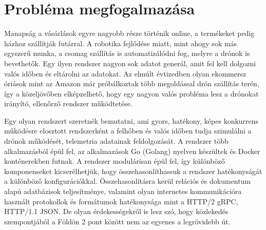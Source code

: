 
\section{Probléma megfogalmazása}
Manapság a vásárlások egyre nagyobb része történik online, a termékeket pedig házhoz szállítják futárral.
A robotika fejlődése miatt, mint ahogy sok más egyszerű munka, a csomag szállítás is automatizálódni fog, melyre a drónok is bevethetők.
Egy ilyen rendszer nagyon sok adatot generál, amit fel kell dolgozni valós időben és eltárolni az adatokat.
Az elmúlt évtizedben olyan ekommersz óriások mint az Amazon már próbálkoztak több megoldással drón szállítás terén, így a közeljövőben elképzelhető, hogy egy nagyon valós probléma lesz a drónokat irányító, ellenőrző rendszer működtetése.

Egy olyan rendszert szeretnék bemutatni, ami gyors, hatékony, képes konkurrens működésre elosztott rendszerként a felhőben és valós időben tudja szimulálni a drónok működését, telemetria adatainak feldolgozását.
A rendszer több alkalmazásból épül fel, az alkalmazások Go (Golang) nyelven készültek és Docker konténerekben futnak.
A rendszer modulárisan épül fel, így különböző komponenseket kicserélhetjük, hogy összehasonlíthassuk a rendszer hatékonyságát a különböző konfigurációkkal.
Összehasonlításra kerül relációs és dokumentum alapú adatbázisok teljesítménye, valamint olyan internetes kommunikációra használt protokollok és formátumok hatékonysága mint a HTTP/2 gRPC, HTTP/1.1 JSON.
De olyan érdekességekről is lesz szó, hogy közlekedés szempontjából a Földön 2 pont között nem az egyenes a legrövidebb út.




